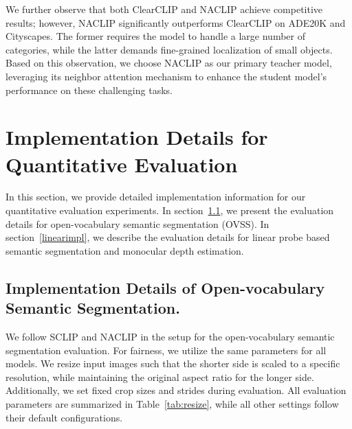 \documentclass{article}
\begin{document}
We further observe that both ClearCLIP and NACLIP achieve competitive results; however, NACLIP significantly outperforms ClearCLIP on ADE20K and Cityscapes. The former requires the model to handle a large number of categories, while the latter demands fine-grained localization of small objects. Based on this observation, we choose NACLIP as our primary teacher model, leveraging its neighbor attention mechanism to enhance the student model's performance on these challenging tasks. \clearpage
\section{Implementation Details for Quantitative Evaluation}\label{eval}
In this section, we provide detailed implementation information for our quantitative evaluation experiments. 
In section~\ref{ovssimpl}, we present the evaluation details for open-vocabulary semantic segmentation (OVSS). In section~\ref{linearimpl}, we describe the evaluation details for linear probe based semantic segmentation and monocular depth estimation.

\subsection{Implementation Details of Open-vocabulary Semantic Segmentation.}
\label{ovssimpl}
We follow SCLIP and NACLIP in the setup for the open-vocabulary semantic segmentation evaluation. For fairness, we utilize the same parameters for all models. We resize input images such that the shorter side is scaled to a specific resolution, while maintaining the original aspect ratio for the longer side. Additionally, we set fixed crop sizes and strides during evaluation. All evaluation parameters are summarized in Table~\ref{tab:resize}, while all other settings follow their default configurations.

\renewcommand{\arraystretch}{1.2}
\begin{table}[t]
\centering
\caption{\textbf{Dataset Specific Details for Open-vocabulary Semantic Segmentation.} We list the per-dataset resolution, crop size, and stride used for each dataset. We maintain the same settings for all methods within a given dataset.}
\vspace{.1cm}
\label{tab:resize}
\end{table}
\end{document}
